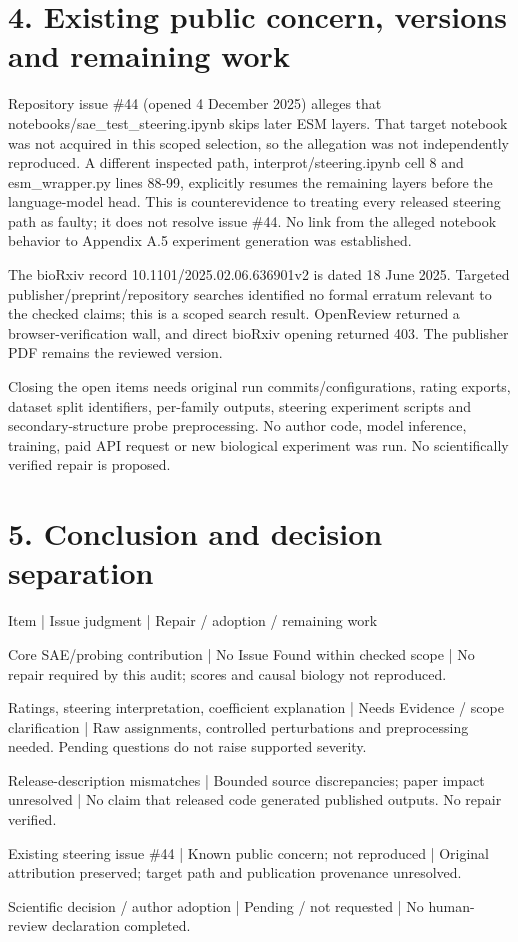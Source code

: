 \documentclass[10pt]{article}
\begin{document}
\section*{4. Existing public concern, versions and remaining work}
Repository issue \#44 (opened 4 December 2025) alleges that notebooks/sae\_test\_steering.ipynb skips later ESM layers. That target notebook was not acquired in this scoped selection, so the allegation was not independently reproduced. A different inspected path, interprot/steering.ipynb cell 8 and esm\_wrapper.py lines 88-99, explicitly resumes the remaining layers before the language-model head. This is counterevidence to treating every released steering path as faulty; it does not resolve issue \#44. No link from the alleged notebook behavior to Appendix A.5 experiment generation was established.\par
The bioRxiv record 10.1101/2025.02.06.636901v2 is dated 18 June 2025. Targeted publisher/preprint/repository searches identified no formal erratum relevant to the checked claims; this is a scoped search result. OpenReview returned a browser-verification wall, and direct bioRxiv opening returned 403. The publisher PDF remains the reviewed version.\par
Closing the open items needs original run commits/configurations, rating exports, dataset split identifiers, per-family outputs, steering experiment scripts and secondary-structure probe preprocessing. No author code, model inference, training, paid API request or new biological experiment was run. No scientifically verified repair is proposed.\par
\section*{5. Conclusion and decision separation}
Item | Issue judgment | Repair / adoption / remaining work\par
Core SAE/probing contribution | No Issue Found within checked scope | No repair required by this audit; scores and causal biology not reproduced.\par
Ratings, steering interpretation, coefficient explanation | Needs Evidence / scope clarification | Raw assignments, controlled perturbations and preprocessing needed. Pending questions do not raise supported severity.\par
Release-description mismatches | Bounded source discrepancies; paper impact unresolved | No claim that released code generated published outputs. No repair verified.\par
Existing steering issue \#44 | Known public concern; not reproduced | Original attribution preserved; target path and publication provenance unresolved.\par
Scientific decision / author adoption | Pending / not requested | No human-review declaration completed.\par
\end{document}
